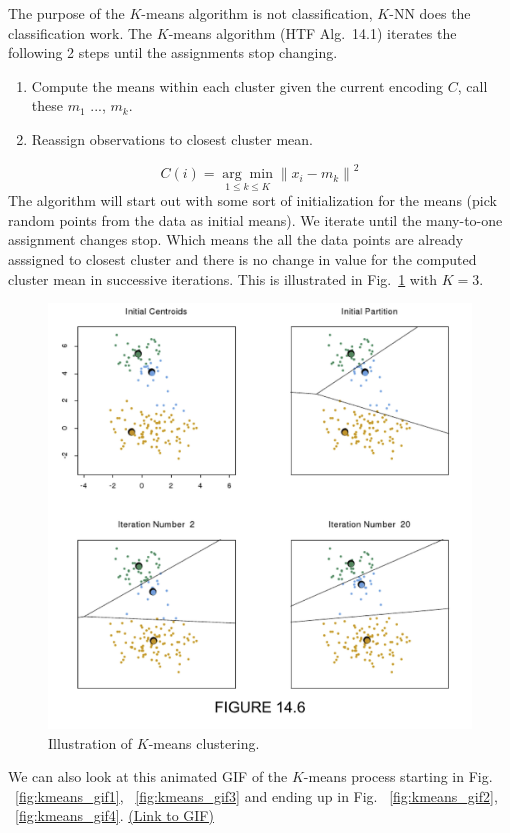 \documentclass[a4paper]{article}
\begin{document}
The purpose of the $K$-means algorithm is not classification, $K$-NN does the classification work.
The $K$-means algorithm (HTF Alg.~14.1) iterates the following 2 steps until the assignments stop changing.

\begin{enumerate}
\item Compute the means within each cluster given the current encoding $C$, call these $m_{1}$ ..., $m_{k}$.  
\item Reassign observations to closest cluster mean.
\end{enumerate} 
$$
C(i) = \underset{1 \leq k \leq K}{\arg\min} {\|x_i - m_{k} \|}^2
$$
The algorithm will start out with some sort of initialization for the means (pick random points from the data as initial means). 
We iterate until the many-to-one assignment changes stop. Which means the all the data points are already asssigned to closest cluster and there is no change in value for the computed cluster mean in successive iterations.
This is illustrated in Fig.~\ref{fig:kmeans} with $K=3$.
\begin{figure}
\centering
\includegraphics[width=1.0\textwidth]{fig14_6.png}
\caption{\label{fig:kmeans}Illustration of $K$-means clustering.}
\end{figure}

We can also look at this animated GIF of the $K$-means process starting in Fig. ~\ref{fig:kmeans_gif1}, ~\ref{fig:kmeans_gif3} and ending up in Fig. ~\ref{fig:kmeans_gif2}, ~\ref{fig:kmeans_gif4}. \href{https://f.hypotheses.org/wp-content/blogs.dir/253/files/2015/02/k-means-5-pts-3B.gif}{(Link to GIF)}
\end{document}
